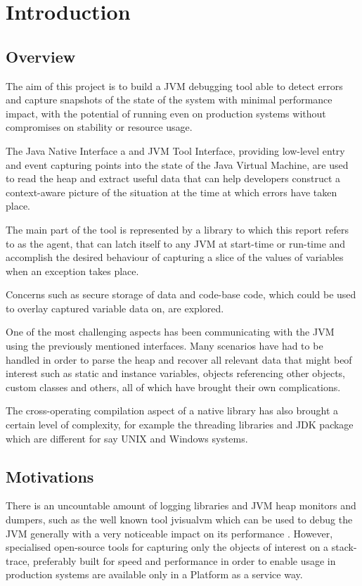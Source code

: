 \section{Introduction}

\subsection{Overview}

The aim of this project is to build a JVM debugging tool able to detect errors and capture snapshots of the state of the system with minimal performance impact, with the potential of running even on production systems without compromises on stability or resource usage.

The Java Native Interface a and JVM Tool Interface, providing low-level entry and event capturing points into the state of the Java Virtual Machine, are used to read the heap and extract useful data that can help developers construct a context-aware picture of the situation at the time at which errors have taken place.

The main part of the tool is represented by a library to which this report refers to as the agent, that can latch itself to any JVM at start-time or run-time and accomplish the desired behaviour of capturing a slice of the values of variables when an exception takes place.

Concerns such as secure storage of data and code-base code, which could be used to overlay captured variable data on, are explored. 

One of the most challenging aspects has been communicating with the JVM using the previously mentioned interfaces. Many scenarios have had to be handled in order to parse the heap and recover all relevant data that might beof interest such as static and instance variables, objects referencing other objects, custom classes and others, all of which have brought their own complications.

The cross-operating compilation aspect of a native library has also brought a certain level of complexity, for example the threading libraries and JDK package which are different for say UNIX and Windows systems.

\subsection{Motivations}

There is an uncountable amount of logging libraries and JVM heap monitors and dumpers, such as the well known tool jvisualvm which can be used to debug the JVM generally with a very noticeable impact on its performance \cite{jvisualvm}. However, specialised open-source tools for capturing only the objects of interest on a stack-trace, preferably built for speed and performance in order to enable usage in production systems are available only in a Platform as a service way.

